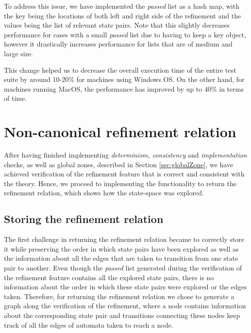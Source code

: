 To address this issue, we have implemented the \textit{passed} list as a hash map, with the key being the locations of both left and right side of the refinement and the values being the list of relevant state pairs. Note that this slightly decreases performance for cases with a small \textit{passed} list due to having to keep a key object, however it drastically increases performance for lists that are of medium and large size.

This change helped us to decrease the overall execution time of the entire test suite by around 10-20\% for machines using Windows OS. On the other hand, for machines running MacOS, the performance has improved by up to 40\% in terms of time.

\section{Non-canonical refinement relation} \label{sec:refRelation}
After having finished implementing \textit{determinism, consistency} and \textit{implementation} checks, as well as global zones, described in Section \ref{sec:globalZone}, we have achieved verification of the refinement feature that is correct and consistent with the theory. Hence, we proceed to implementing the functionality to return the refinement relation, which shows how the state-space was explored. 

\subsection{Storing the refinement relation}
The first challenge in returning the refinement relation became to correctly store it while preserving the order in which state pairs have been explored as well as the information about all the edges that are taken to transition from one state pair to another. Even though the \textit{passed} list generated during the verification of the refinement feature contains all the explored state pairs, there is no information about the order in which these state pairs were explored or the edges taken. Therefore, for returning the refinement relation we chose to generate a graph along the verification of the refinement, where a node contains information about the corresponding state pair and transitions connecting these nodes keep track of all the edges of automata taken to reach a node.

